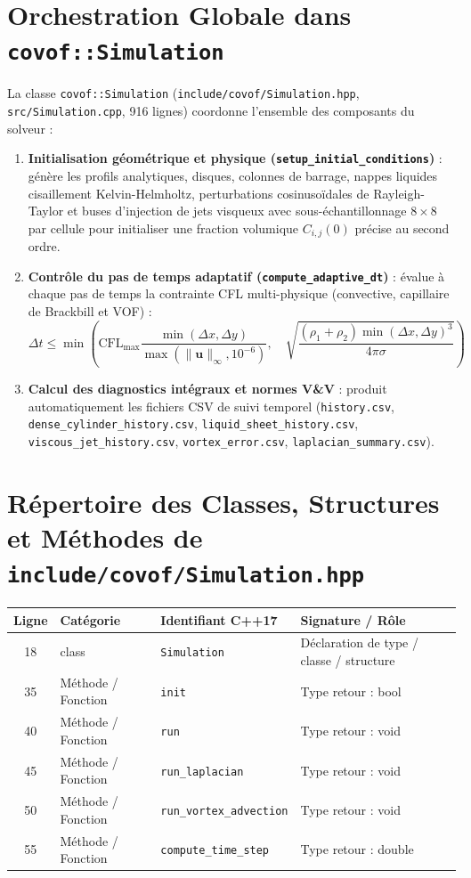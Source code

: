 \documentclass[10pt,a4paper,oneside]{book}
\begin{document}
\section{Orchestration Globale dans \texttt{covof::Simulation}}
La classe \texttt{covof::Simulation} (\texttt{include/covof/Simulation.hpp}, \texttt{src/Simulation.cpp}, 916 lignes) coordonne l'ensemble des composants du solveur :
\begin{enumerate}
  \item \textbf{Initialisation géométrique et physique (\texttt{setup\_initial\_conditions})} : génère les profils analytiques, disques, colonnes de barrage, nappes liquides cisaillement Kelvin-Helmholtz, perturbations cosinusoïdales de Rayleigh-Taylor et buses d'injection de jets visqueux avec sous-échantillonnage $8 \times 8$ par cellule pour initialiser une fraction volumique $C_{i,j}(0)$ précise au second ordre.
  \item \textbf{Contrôle du pas de temps adaptatif (\texttt{compute\_adaptive\_dt})} : évalue à chaque pas de temps la contrainte CFL multi-physique (convective, capillaire de Brackbill et VOF) :
  \begin{equation}
    \Delta t \le \min\left( \text{CFL}_{\max} \frac{\min(\Delta x, \Delta y)}{\max(\|\mathbf{u}\|_\infty, 10^{-6})}, \quad \sqrt{\frac{(\rho_1 + \rho_2)\min(\Delta x, \Delta y)^3}{4\pi \sigma}} \right)
  \end{equation}
  \item \textbf{Calcul des diagnostics intégraux et normes V\&V} : produit automatiquement les fichiers CSV de suivi temporel (\texttt{history.csv}, \texttt{dense\_cylinder\_history.csv}, \texttt{liquid\_sheet\_history.csv}, \texttt{viscous\_jet\_history.csv}, \texttt{vortex\_error.csv}, \texttt{laplacian\_summary.csv}).
\end{enumerate}

\section{Répertoire des Classes, Structures et Méthodes de \texttt{include/covof/Simulation.hpp}}
\begin{center}\small
\begin{tabular}{clll}
\toprule
\textbf{Ligne} & \textbf{Catégorie} & \textbf{Identifiant C++17} & \textbf{Signature / Rôle} \\
\midrule
18 & class & \texttt{Simulation} & Déclaration de type / classe / structure \\
35 & Méthode / Fonction & \texttt{init} & Type retour : bool \\
40 & Méthode / Fonction & \texttt{run} & Type retour : void \\
45 & Méthode / Fonction & \texttt{run\_laplacian} & Type retour : void \\
50 & Méthode / Fonction & \texttt{run\_vortex\_advection} & Type retour : void \\
55 & Méthode / Fonction & \texttt{compute\_time\_step} & Type retour : double \\
\bottomrule
\end{tabular}
\end{center}
\end{document}
